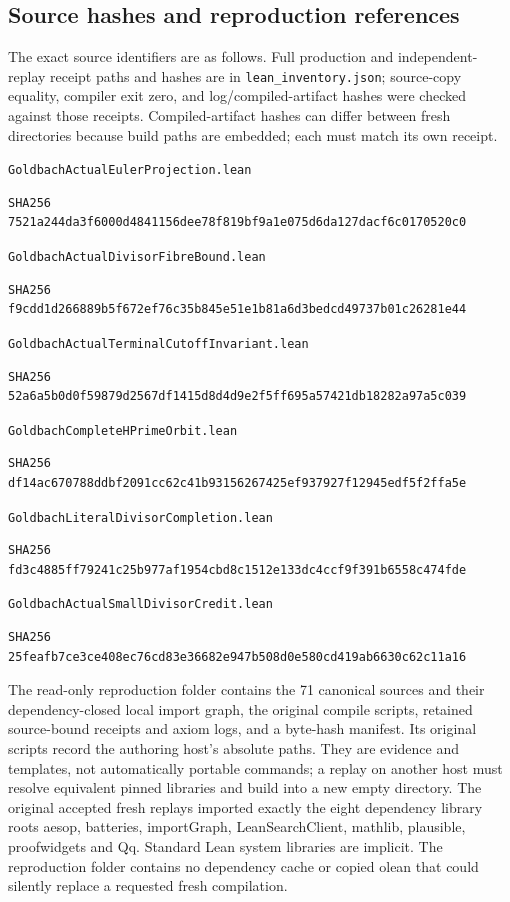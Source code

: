 \documentclass[11pt,a4paper]{article}
\theoremstyle{definition}
\theoremstyle{remark}
\begin{document}
\subsection{Source hashes and reproduction references}

The exact source identifiers are as follows. Full production and
independent-replay receipt paths and hashes are in
\texttt{lean\_inventory.json}; source-copy equality, compiler exit zero,
and log/compiled-artifact hashes were checked against those receipts.
Compiled-artifact hashes can differ between fresh directories because
build paths are embedded; each must match its own receipt.

\noindent\texttt{GoldbachActualEulerProjection.lean}
\begin{lstlisting}
SHA256 7521a244da3f6000d4841156dee78f819bf9a1e075d6da127dacf6c0170520c0
\end{lstlisting}

\noindent\texttt{GoldbachActualDivisorFibreBound.lean}
\begin{lstlisting}
SHA256 f9cdd1d266889b5f672ef76c35b845e51e1b81a6d3bedcd49737b01c26281e44
\end{lstlisting}

\noindent\texttt{GoldbachActualTerminalCutoffInvariant.lean}
\begin{lstlisting}
SHA256 52a6a5b0d0f59879d2567df1415d8d4d9e2f5ff695a57421db18282a97a5c039
\end{lstlisting}

\noindent\texttt{GoldbachCompleteHPrimeOrbit.lean}
\begin{lstlisting}
SHA256 df14ac670788ddbf2091cc62c41b93156267425ef937927f12945edf5f2ffa5e
\end{lstlisting}

\noindent\texttt{GoldbachLiteralDivisorCompletion.lean}
\begin{lstlisting}
SHA256 fd3c4885ff79241c25b977af1954cbd8c1512e133dc4ccf9f391b6558c474fde
\end{lstlisting}

\noindent\texttt{GoldbachActualSmallDivisorCredit.lean}
\begin{lstlisting}
SHA256 25feafb7ce3ce408ec76cd83e36682e947b508d0e580cd419ab6630c62c11a16
\end{lstlisting}

The read-only reproduction folder contains the 71 canonical sources
and their dependency-closed local import graph, the original compile
scripts, retained source-bound receipts and axiom logs, and a byte-hash
manifest. Its original scripts record the authoring host's absolute
paths. They are evidence and templates, not automatically portable
commands; a replay on another host must resolve equivalent pinned
libraries and build into a new empty directory. The original accepted
fresh replays imported exactly the eight dependency library roots
aesop, batteries, importGraph, LeanSearchClient, mathlib, plausible,
proofwidgets and Qq. Standard Lean system libraries are implicit.
The reproduction folder contains no dependency cache or copied olean
that could silently replace a requested fresh compilation.
\end{document}
